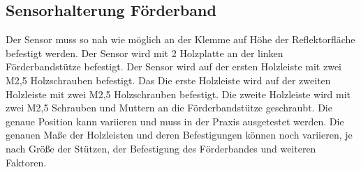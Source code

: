 \subsection{Sensorhalterung Förderband}
Der Sensor muss so nah wie möglich an der Klemme auf Höhe der Reflektorfläche befestigt werden. Der Sensor wird mit 2 Holzplatte an der linken Förderbandstütze befestigt. Der Sensor wird auf der ersten Holzleiste mit zwei M2,5 Holzschrauben befestigt. Das Die erste Holzleiste wird auf der zweiten Holzleiste mit zwei M2,5 Holzschrauben befestigt. Die zweite Holzleiste wird mit zwei M2,5 Schrauben und Muttern an die Förderbandstütze geschraubt. Die genaue Position kann variieren und muss in der Praxis ausgetestet werden. Die genauen Maße der Holzleisten und deren Befestigungen können noch variieren, je nach Größe der Stützen, der Befestigung des Förderbandes und weiteren Faktoren.

